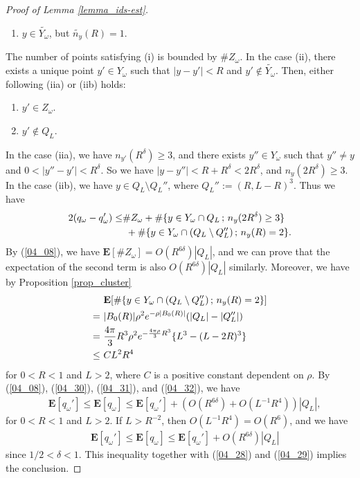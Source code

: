 \documentclass[12pt,a4paper]{article}
\begin{document}
\begin{proof}[Proof of Lemma \ref{lemma_ids-est}]
\begin{enumerate}
 \item[(ii)] $y\in \widetilde{Y_\omega}$, but $\widetilde{n_y}(R)=1$.
\end{enumerate}
The number of points satisfying (i) is bounded by $\#Z_\omega$.
In the case (ii), there exists a unique point $y'\in Y_\omega$
such that $|y-y'|<R$ and $y'\not\in \widetilde{Y_\omega}$.
Then, either following (iia) or (iib) holds:
\begin{enumerate}
 \item[(iia)] $y'\in Z_\omega$.
 \item[(iib)] $y'\not\in Q_L$.
\end{enumerate}
In the case (iia), we have $n_{y'}(R^\delta)\geq 3$,
and there exists $y''\in Y_\omega$ such that $y''\not= y$ and $0<|y''-y'|<R^\delta$.
So we have $|y-y''|<R+R^\delta < 2R^\delta$,
and $n_y(2R^\delta) \geq 3$.
In the case (iib), we have $y\in Q_L\setminus Q_L''$,
where $Q_L'':=(R,L-R)^3$.
Thus we have
\begin{align}
2(q_\omega-q_\omega')
\leq 
&
\# Z_\omega
 +
\#\{y\in Y_\omega\cap Q_L \,;\, n_{y}(2R^\delta)\geq 3\}\notag\\
&\ +
\#\{y\in Y_\omega\cap (Q_L\setminus Q_L'') \,;\, n_{y}(R)= 2\}.
 \label{04_31}
\end{align}
By (\ref{04_08}), we have $\mathbf{E}[\# Z_\omega]=O(R^{6\delta})|Q_L|$,
and we can prove that the expectation of the second term is also 
$O(R^{6\delta})|Q_L|$ similarly.
Moreover, we have by Proposition \ref{prop_cluster}
\begin{align}
&\  \mathbf{E}[\#\{y\in Y_\omega\cap (Q_L\setminus Q_L'') \,;\, n_{y}(R)= 2\}]
\notag\\
=&\ |B_0(R)|\rho^2 e^{-\rho|B_0(R)|}(|Q_L|-|Q_L''|)\notag\\
=&\ 
\frac{4\pi}{3}R^3 \rho^2 e^{-\frac{4\pi \rho}{3}R^3}
\{L^3-(L-2R)^3\}\notag\\
\leq &\ 
C L^2R^4
\label{04_32}
\end{align}
for $0<R<1$ and $L>2$,
where $C$ is a positive constant dependent on $\rho$.
By (\ref{04_08}), (\ref{04_30}), (\ref{04_31}), and (\ref{04_32}),
we have
\begin{align*}
&\ 
\mathbf{E}[ q_\omega']
\leq  
\mathbf{E}[q_\omega] 
\leq 
\mathbf{E}[q_\omega']+
\left(
O(R^{6\delta})
+O(L^{-1}R^4)
\right)|Q_L|,
\end{align*}
for $0<R<1$ and $L>2$.
If $L>R^{-2}$, then $O(L^{-1}R^4)=O(R^6)$,
and we have
\begin{align*}
&\ 
\mathbf{E}[ q_\omega']
\leq  
\mathbf{E}[q_\omega] 
\leq 
\mathbf{E}[q_\omega']+
O(R^{6\delta})|Q_L|
\end{align*}
since $1/2<\delta <1$.
This inequality together with (\ref{04_28}) and (\ref{04_29})
implies the conclusion.
 \end{proof}
\end{document}
